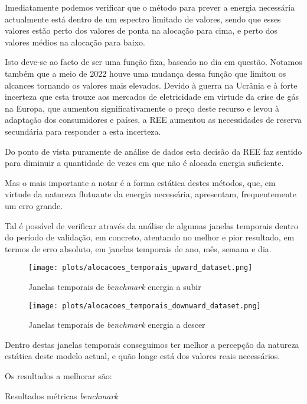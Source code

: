 Imediatamente podemos verificar que o método para prever a energia necessária actualmente está dentro de um espectro limitado de valores, sendo que esses valores estão perto dos valores de ponta na alocação para cima, e perto dos valores médios na alocação para baixo.\par
Isto deve-se ao facto de ser uma função fixa, baseado no dia em questão. Notamos também que a meio de 2022 houve uma mudança dessa função que limitou os alcances tornando os valores mais elevados. Devido à guerra na Ucrânia e à forte incerteza que esta trouxe aos mercados de eletricidade em virtude da crise de gás na Europa, que aumentou significativamente o preço deste recurso e levou à adaptação dos consumidores e países, a \gls{REE} aumentou as necessidades de reserva secundária para responder a esta incerteza.\par
Do ponto de vista puramente de análise de dados esta decisão da \gls{REE} faz sentido para diminuir a quantidade  de vezes em que não é alocada energia suficiente.\par
Mas o mais importante a notar é a forma estática destes métodos, que, em virtude da natureza flutuante da energia necessária, apresentam, frequentemente um erro grande.\par
Tal é possível de verificar através da análise de algumas janelas temporais dentro do período de validação, em concreto, atentando no melhor e pior resultado, em termos de erro absoluto, em janelas temporais de ano, mês, semana e dia.\par


\begin{figure}[H]
    \centering
    \texttt{[image: plots/alocacoes\_temporais\_upward\_dataset.png]}
    \caption{Janelas temporais de \textit{benchmark} energia a subir}
    \label{fig:benchmarktimewindowsup}
\end{figure}


\begin{figure}[H]
    \centering
    \texttt{[image: plots/alocacoes\_temporais\_downward\_dataset.png]}
    \caption{Janelas temporais de \textit{benchmark} energia a descer}
    \label{fig:benchmarktimewindowsdown}
\end{figure}

Dentro destas janelas temporais conseguimos ter melhor a percepção da natureza estática deste modelo actual, e quão longe está dos valores reais necessários.\par

Os resultados a melhorar são:\\
\begin{table}[H]
    \centering
    \caption{Resultados métricas \textit{benchmark}}    
    \resizebox{0.8\linewidth}{!}{}
    \label{tab:benchmarkmetrics}
    \end{table}

